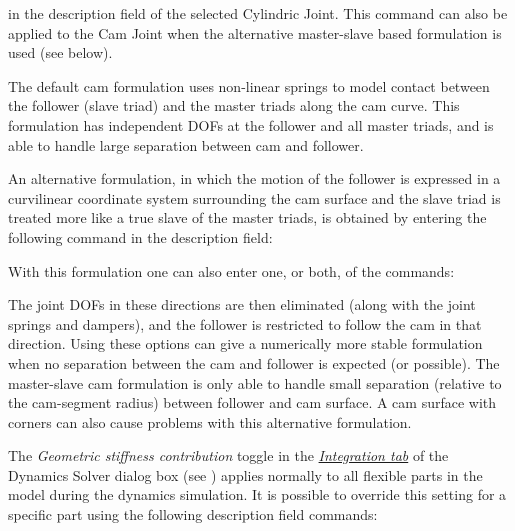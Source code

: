 
\noindent
in the description field of the selected Cylindric Joint. This command
can also be applied to the Cam Joint when the alternative master-slave
based formulation is used (see  below).



The default cam formulation uses non-linear springs to model contact
between the follower (slave triad) and the master triads along the cam curve.
This formulation has independent DOFs at the follower and all master triads,
and is able to handle large separation between cam and follower.

An alternative formulation, in which the motion of the follower is
expressed in a curvilinear coordinate system surrounding the cam surface
and the slave triad is treated more like a true slave of the master triads,
is obtained by entering the following command in the description field:


\noindent
With this formulation one can also enter one, or both, of the commands:


\noindent
The joint DOFs in these directions are then eliminated (along with the
joint springs and dampers), and the follower is restricted to follow the
cam in that direction. Using these options can give a numerically more
stable formulation when no separation between the cam and follower is
expected (or possible). The master-slave cam formulation is only able to
handle small separation (relative to the cam-segment radius) between
follower and cam surface. A cam surface with corners can also cause
problems with this alternative formulation.




The {\sl Geometric stiffness contribution} toggle in the
\protect\hyperlink{integration-tab}{\sl Integration tab} of the Dynamics Solver
dialog box (see
)
applies normally to all flexible parts in the model during the dynamics
simulation. It is possible to override this setting for a specific part
using the following description field commands:

